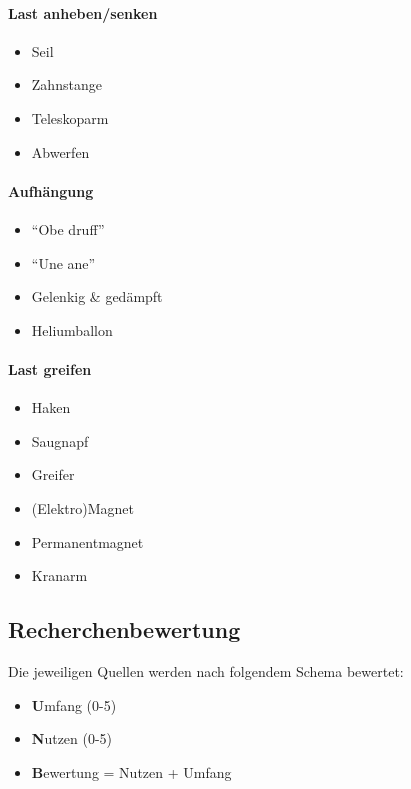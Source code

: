 \documentclass[a4paper]{report}
\begin{document}
\begin{multicols}{2}
\paragraph{Last anheben/senken}
\begin{itemize}[noitemsep]
	\item Seil
	\item Zahnstange
	\item Teleskoparm
	\item Abwerfen
\end{itemize}
\vspace{2em}
\paragraph{Aufhängung}
\begin{itemize}[noitemsep]
	\item \textquotedblleft Obe druff\textquotedblright
	\item \textquotedblleft Une ane\textquotedblright
	\item Gelenkig \& gedämpft
	\item Heliumballon
\end{itemize}

\paragraph{Last greifen}
\begin{itemize}[noitemsep]
	\item Haken
	\item Saugnapf
	\item Greifer
	\item (Elektro)Magnet
	\item Permanentmagnet
	\item Kranarm
\end{itemize}
\end{multicols}

\subsection{Recherchenbewertung}
Die jeweiligen Quellen werden nach folgendem Schema bewertet:
\begin{itemize}
	\item \textbf{U}mfang (0-5)
	\item \textbf{N}utzen (0-5)
	\item \textbf{B}ewertung = Nutzen + Umfang
\end{itemize}
\end{document}
